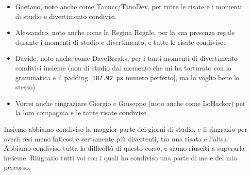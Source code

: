 \begin{spacing}{\myspacing}
\begin{itemize}[nosep] %
    \item Gaetano, noto anche come Tanucc/TanoDev, per tutte le risate e i momenti di studio e divertimento condivisi.
    \item  Alessandro, noto anche come la Regina Regale, per la sua presenza regale durante i momenti di studio e divertimento, e tutte le risate condivise.
    \item Davide, noto anche come DaveBreaks, per i tanti momenti di divertimento condivisi insieme (non di studio dal momento che mi ha torturato con la grammatica e il padding [\texttt{187.92 px} numero perfetto], ma lo voglio bene lo stesso).
    \item Vorrei anche ringraziare Giorgio e Giuseppe (noto anche come LoHacker) per la loro compagnia e le tante risate condivise.
\end{itemize}
\vspace{2ex}
\noindent Insieme abbiamo condiviso la maggior parte dei giorni di studio, e li ringrazio per averli resi meno faticosi e certamente più divertenti, tra una risata e l'altra. Abbiamo condiviso tutta la difficoltà di questo corso, e siamo riusciti a superarla insieme.
\vspace{2ex}
\newline \noindent Ringrazio tutti voi con i quali ho condiviso una parte di me e del mio percorso.
\end{spacing}


